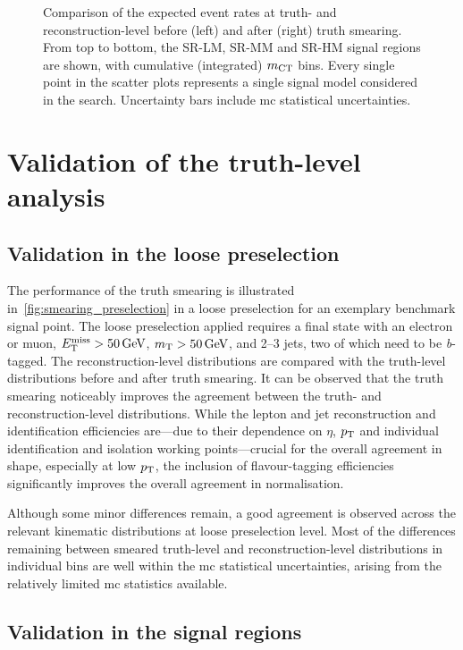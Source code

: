 \begin{figure}
\begin{subfigure}[b]{0.49\linewidth}
	\end{subfigure}
	\caption{Comparison of the expected event rates at truth- and reconstruction-level before (left) and after (right) truth smearing. From top to bottom, the SR-LM, SR-MM and SR-HM signal regions are shown, with cumulative (integrated) $m_{\textrm{CT}}$ bins. Every single point in the scatter plots represents a single signal model considered in the \onelepton search. Uncertainty bars include \gls{mc} statistical uncertainties.}
	\label{fig:smearing_signal_regions}
\end{figure} 
 
\section{Validation of the truth-level analysis}

\subsection{Validation in the loose preselection}

 The performance of the truth smearing is illustrated in~\cref{fig:smearing_preselection} in a loose preselection for an exemplary benchmark signal point.
 The loose preselection applied requires a final state with an electron or muon, $\met>\SI{50}{\GeV}$, $\mt > \SI{50}{\GeV}$, and 2--3 jets, two of which need to be \textit{b}-tagged.
 The reconstruction-level distributions are compared with the truth-level distributions before and after truth smearing. It can be observed that the truth smearing noticeably improves the agreement between the truth- and reconstruction-level distributions.
 While the lepton and jet reconstruction and identification efficiencies are---due to their dependence on $\eta$, $p_{\mathrm{T}}$ and individual identification and isolation working points---crucial for the overall agreement in shape, especially at low $p_{\mathrm{T}}$, the inclusion of flavour-tagging efficiencies significantly improves the overall agreement in normalisation.
 
Although some minor differences remain, a good agreement is observed across the relevant kinematic distributions at loose preselection level.
Most of the differences remaining between smeared truth-level and reconstruction-level distributions in individual bins are well within the \gls{mc} statistical uncertainties, arising from the relatively limited \gls{mc} statistics available.

 
 \subsection{Validation in the signal regions}
 

